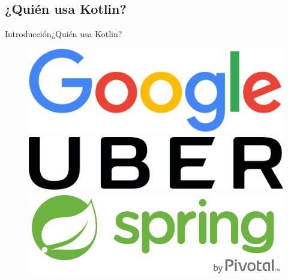 \subsection{¿Quién usa Kotlin?}
\begin{frame}{Introducción}{¿Quién usa Kotlin?}
  \begin{figure}[!htb]
    \includegraphics[width=\linewidth]{images/introduction/google_logo}
  \endminipage\hfill
    \includegraphics[width=\linewidth]{images/introduction/uber_logo}
  \endminipage\hfill
    \includegraphics[width=\linewidth]{images/introduction/spring_logo}
  \endminipage
  \end{figure}


\end{frame}
